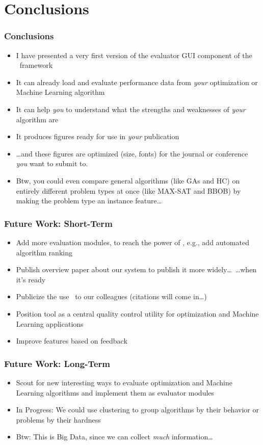 %
\section{Conclusions}%
%
\begin{frame}%
\frametitle{Conclusions}%
\begin{itemize}%
\item I have presented a very first version of the evaluator GUI component of the \optimizationBenchmarking\ framework%
\item<2-> It can already load and evaluate performance data from \emph{your} optimization or Machine Learning algorithm%
\item<3-> It can help \emph{you} to understand what the strengths and weaknesses of \emph{your} algorithm are%
\item<4-> It produces figures ready for use in \emph{your} publication%
\item<5-> {\dots}and these figures are optimized (size, fonts) for the journal or conference \emph{you} want to submit to.%
\item<6-> Btw, you could even compare general algorithms (like GAs and HC) on entirely different problem types at once (like MAX-SAT and BBOB) by making the problem type an instance feature\dots%
\end{itemize}%
\end{frame}
%
%
\begin{frame}%
\frametitle{Future Work: Short-Term}%
\begin{itemize}%
\item Add more evaluation modules, to reach the power of \tspSuite\expandafter\scitep{\tspSuiteReferences}, e.g., add automated algorithm ranking%
\item<2-> Publish overview paper about our system to publish it more widely\dots\ {\dots}when it's ready%
\item<3-> Publicize the use \optimizationBenchmarking\ to our colleagues (citations will come in\dots)%
\item<4-> Position tool as a central quality control utility for optimization and Machine Learning applications%
\item<5-> Improve features based on feedback%
\end{itemize}%
\end{frame}
%
\begin{frame}%
\frametitle{Future Work: Long-Term}%
\begin{itemize}%
\item Scout for new interesting ways to evaluate optimization and Machine Learning algorithms and implement them as evaluator modules%
\item<2-> In Progress: We could use clustering to group algorithms by their behavior or problems by their hardness%
\item<3-> Btw: This is Big Data, since we can collect \emph{much} information\dots%
\end{itemize}%
\end{frame}%
%